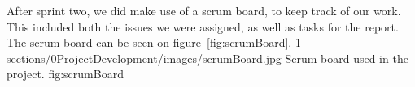 After sprint two, we did make use of a scrum board, to keep track of our work. This included both the issues we were assigned, as well as tasks for the report. The scrum board can be seen on figure~\ref{fig:scrumBoard}.
        {1} %
        {sections/0ProjectDevelopment/images/scrumBoard.jpg} %
        {Scrum board used in the project.} %
        {fig:scrumBoard} %